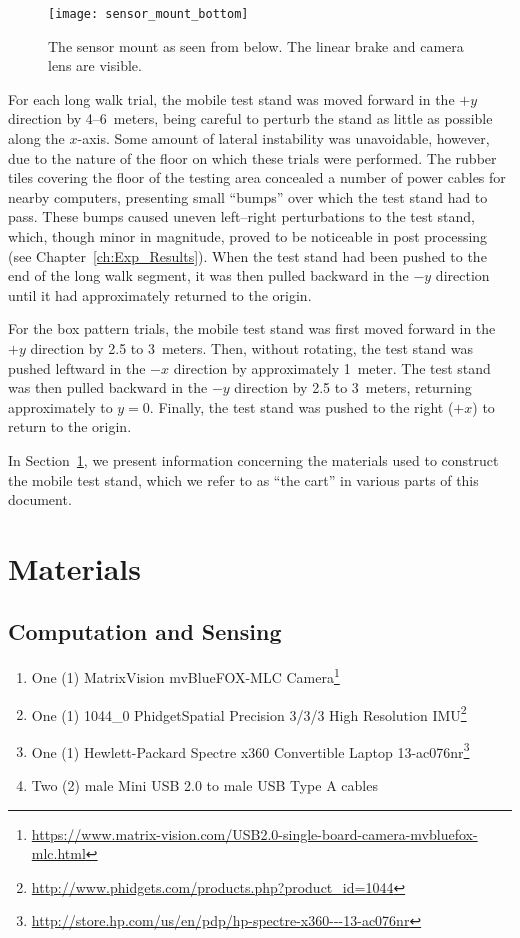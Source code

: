 \begin{figure}
        \centering
        \texttt{[image: sensor\_mount\_bottom]}
        \caption[Sensor Mount Bottom View]{The sensor mount as seen from below. The linear brake and camera lens are visible.}
        \label{fig:sensor_mount_bottom}
\end{figure}

For each long walk trial, the mobile test stand was moved forward in the $+y$ direction by 4--6~meters, being careful to perturb the stand as little as possible along the $x$-axis. Some amount of lateral instability was unavoidable, however, due to the nature of the floor on which these trials were performed. The rubber tiles covering the floor of the testing area concealed a number of power cables for nearby computers, presenting small ``bumps'' over which the test stand had to pass. These bumps caused uneven left--right perturbations to the test stand, which, though minor in magnitude, proved to be noticeable in post processing (see Chapter~\ref{ch:Exp_Results}). When the test stand had been pushed to the end of the long walk segment, it was then pulled backward in the $-y$ direction until it had approximately returned to the origin.

For the box pattern trials, the mobile test stand was first moved forward in the $+y$ direction by 2.5 to 3~meters. Then, without rotating, the test stand was pushed leftward in the $-x$ direction by approximately 1~meter. The test stand was then pulled backward in the $-y$ direction by 2.5 to 3~meters, returning approximately to $y = 0$. Finally, the test stand was pushed to the right ($+x$) to return to the origin.

In Section~\ref{sec:materials}, we present information concerning the materials used to construct the mobile test stand, which we refer to as ``the cart'' in various parts of this document.

\section{Materials} \label{sec:materials}
\subsection{Computation and Sensing}
\begin{enumerate}
\item One (1) MatrixVision mvBlueFOX-MLC Camera\footnote{\url{https://www.matrix-vision.com/USB2.0-single-board-camera-mvbluefox-mlc.html}}
\item One (1) 1044\_0 PhidgetSpatial Precision 3/3/3 High Resolution IMU\footnote{\url{http://www.phidgets.com/products.php?product_id=1044}}
\item One (1) Hewlett-Packard Spectre x360 Convertible Laptop 13-ac076nr\footnote{\url{http://store.hp.com/us/en/pdp/hp-spectre-x360---13-ac076nr}}
\item Two (2) male Mini USB 2.0 to male USB Type A cables
\end{enumerate}

